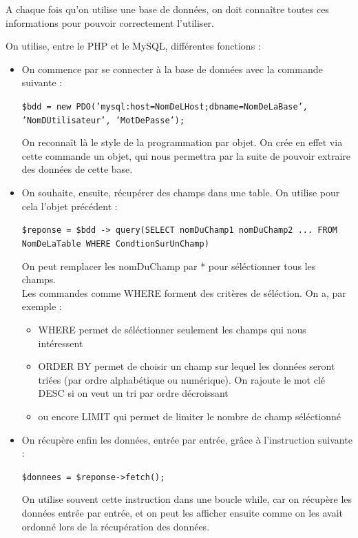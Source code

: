 \documentclass{article}
\begin{document}
A chaque fois qu'on utilise une base de données, on doit connaître toutes ces informations pour pouvoir correctement l'utiliser. 

\bigskip
On utilise, entre le PHP et le MySQL, différentes fonctions :
\begin{itemize}
	\item On commence par se connecter à la base de données avec la commande suivante : \\
	\begin{center} \texttt{\$bdd = new PDO('mysql:host=NomDeLHost;dbname=NomDeLaBase', 'NomDUtilisateur', 'MotDePasse');} \end{center}
		On reconnaît là le style de la programmation par objet. On crée en effet via cette commande un objet, qui nous permettra par la suite de pouvoir extraire des données de cette base.

		\bigskip
	\item On souhaite, ensuite, récupérer des champs dans une table. On utilise pour cela l'objet précédent :\\
		\begin{center} \texttt{\$reponse = \$bdd -> query(SELECT nomDuChamp1 nomDuChamp2 ... FROM NomDeLaTable WHERE CondtionSurUnChamp)} \end{center}
		On peut remplacer les nomDuChamp par * pour séléctionner tous les champs.\\
		Les commandes comme WHERE forment des critères de séléction. On a, par exemple :
		\begin{itemize}
			\item WHERE permet de séléctionner seulement les champs qui nous intéressent
			\item ORDER BY permet de choisir un champ sur lequel les données seront triées (par ordre alphabétique ou numérique). On rajoute le mot clé DESC si on veut un tri par ordre décroissant
			\item ou encore LIMIT qui permet de limiter le nombre de champ séléctionné
		\end{itemize}

		\bigskip
	\item On récupère enfin les données, entrée par entrée, grâce à l'instruction suivante : 
		\begin{center} \texttt{\$donnees = \$reponse->fetch();} \end{center}
		On utilise souvent cette instruction dans une boucle while, car on récupère les données entrée par entrée, et on peut les afficher ensuite comme on les avait ordonné lors de la récupération des données.


\end{itemize}
\end{document}
